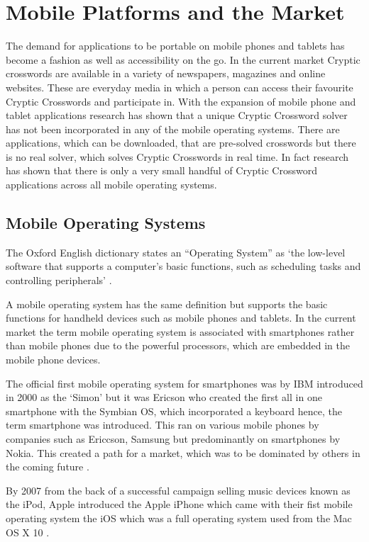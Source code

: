 \section{Mobile Platforms and the Market}

The demand for applications to be portable on mobile phones and tablets has
become a fashion as well as accessibility on the go. In the current market
Cryptic crosswords are available in a variety of newspapers, magazines and
online websites. These are everyday media in which a person can access their
favourite Cryptic Crosswords and participate in. With the expansion of mobile
phone and tablet applications research has shown that a unique Cryptic Crossword
solver has not been incorporated in any of the mobile operating systems. There
are applications, which can be downloaded, that are pre-solved crosswords but
there is no real solver, which solves Cryptic Crosswords in real time. In fact
research has shown that there is only a very small handful of Cryptic Crossword
applications across all mobile operating systems.

\subsection{Mobile Operating Systems}

The Oxford English dictionary states an ``Operating System'' as `the low-level
software that supports a computer's basic functions, such as scheduling tasks
and controlling peripherals' \citep{oxford_dictionary11}.

A mobile operating system has the same definition but supports the basic
functions for handheld devices such as mobile phones and tablets. In the current
market the term mobile operating system is associated with smartphones rather
than mobile phones due to the powerful processors, which are embedded in the
mobile phone devices.

The official first mobile operating system for smartphones was by IBM introduced
in 2000 as the `Simon' but it was Ericson who created the first all in one
smartphone with the Symbian OS, which incorporated a keyboard hence, the term
smartphone was introduced. This ran on various mobile phones by companies such
as Ericcson, Samsung but predominantly on smartphones by Nokia. This created a
path for a market, which was to be dominated by others in the coming future
\citep{smartphone11}.

By 2007 from the back of a successful campaign selling music devices known as
the iPod, Apple introduced the Apple iPhone which came with their fist mobile
operating system the iOS which was a full operating system used from the Mac OS
X 10 \citep{macworld07}.

